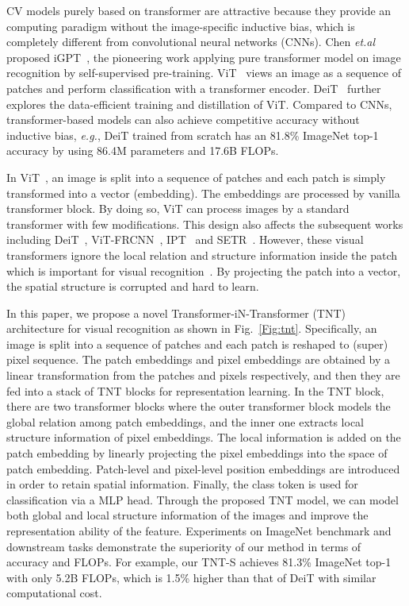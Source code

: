 \documentclass{article}
\begin{document}
CV models purely based on transformer are attractive because they provide an computing paradigm without the image-specific inductive bias, which is completely different from convolutional neural networks (CNNs). Chen \emph{et.al} proposed iGPT~\cite{igpt}, the pioneering work applying pure transformer model on image recognition by self-supervised pre-training. ViT~\cite{vit} views an image as a sequence of patches and perform classification with a transformer encoder. DeiT~\cite{deit} further explores the data-efficient training and distillation of ViT. Compared to CNNs, transformer-based models can also achieve competitive accuracy without inductive bias, \emph{e.g.}, DeiT trained from scratch has an 81.8\% ImageNet top-1 accuracy by using 86.4M parameters and 17.6B FLOPs.

In ViT~\cite{vit}, an image is split into a sequence of patches and each patch is simply transformed into a vector (embedding). The embeddings are processed by vanilla transformer block. By doing so, ViT can process images by a standard transformer with few modifications. This design also affects the subsequent works including DeiT~\cite{deit}, ViT-FRCNN~\cite{beal2020toward}, IPT~\cite{ipt} and SETR~\cite{setr}. However, these visual transformers ignore the local relation and structure information inside the patch which is important for visual recognition~\cite{sift,bagnet}. By projecting the patch into a vector, the spatial structure is corrupted and hard to learn.

In this paper, we propose a novel Transformer-iN-Transformer (TNT) architecture for visual recognition as shown in Fig.~\ref{Fig:tnt}. Specifically, an image is split into a sequence of patches and each patch is reshaped to (super) pixel sequence. The patch embeddings and pixel embeddings are obtained by a linear transformation from the patches and pixels respectively, and then they are fed into a stack of TNT blocks for representation learning. In the TNT block, there are two transformer blocks where the outer transformer block models the global relation among patch embeddings, and the inner one extracts local structure information of pixel embeddings. The local information is added on the patch embedding by linearly projecting the pixel embeddings into the space of patch embedding. Patch-level and pixel-level position embeddings are introduced in order to retain spatial information. Finally, the class token is used for classification via a MLP head. Through the proposed TNT model, we can model both global and local structure information of the images and improve the representation ability of the feature. Experiments on ImageNet benchmark and downstream tasks demonstrate the superiority of our method in terms of accuracy and FLOPs. For example, our TNT-S achieves 81.3\% ImageNet top-1 with only 5.2B FLOPs, which is 1.5\% higher than that of DeiT with similar computational cost.
\end{document}

